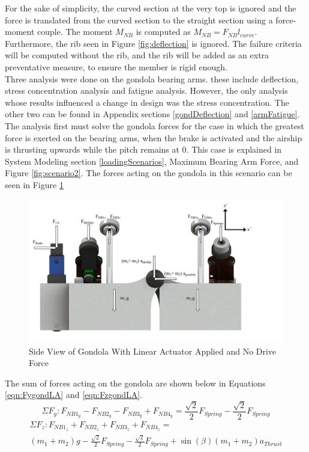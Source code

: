 \documentclass[../main.tex]{subfiles}
\begin{document}
For the sake of simplicity, the curved section at the very top is ignored and the force is translated from the curved section to the straight section using a force-moment couple. The moment $M_{NB}$ is computed as $M_{NB}=F_{NB}l_{curve}$. Furthermore, the rib seen in Figure \ref{fig:deflection} is ignored. The failure criteria will be computed without the rib, and the rib will be added as an extra preventative measure, to ensure the member is rigid enough.\\

Three analysis were done on the gondola bearing arms. these include deflection, stress concentration analysis and fatigue analysis. However, the only analysis whose results influenced a change in design was the stress concentration. The other two can be found in Appendix sections \ref{gondDeflection} and \ref{armFatigue}.\\

The analysis first must solve the gondola forces for the case in which the greatest force is exerted on the bearing arms, when the brake is activated and the airship is thrusting upwards while the pitch remains at 0. This case is explained in System Modeling section \ref{loadingScenarios}, Maximum Bearing Arm Force, and Figure \ref{fig:scenario2}. The forces acting on the gondola in this scenario can be seen in Figure \ref{fig:sideGondolaLA}
\begin{figure}[H]
	\centering
	\includegraphics[width=1.1\textwidth]{img/gondola/gondolaSideLA.pdf}
	\caption{Side View of Gondola With Linear Actuator Applied and No Drive Force}
	\label{fig:sideGondolaLA}
\end{figure}
 The sum of forces acting on the gondola are shown below in Equations \ref{eqn:FygondLA} and \ref{eqn:FzgondLA}. 
\begin{equation} \label{eqn:FygondLA}
\Sigma F_{y} : F_{NB1_{y}} - F_{NB2_{y}} - F_{NB3_{y}} + F_{NB4_{y}} = \frac{\sqrt{2}}{2} F_{Spring} -\frac{\sqrt{2}}{2} F_{Spring} 
\end{equation}
\begin{multline} \label{eqn:FzgondLA}
\Sigma F_{z} : F_{NB1_{z}} + F_{NB2_{z}} + F_{NB3_{z}} + F_{NB4_{z}} =\\ (m_{1} + m_2)g - \frac{\sqrt{2}}{2} F_{Spring} - \frac{\sqrt{2}}{2} F_{Spring} + \sin(\beta) (m_1+m_2) a_{Thrust}
\end{multline}
 
\end{document}
